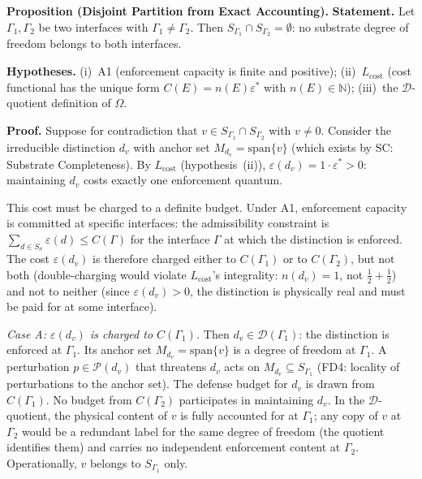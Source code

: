 \documentclass[11pt]{article}
\theoremstyle{remark}
\begin{document}
\medskip\noindent\textbf{Proposition (Disjoint Partition from Exact Accounting).}
\label{prop:disjoint_partition}
\textbf{Statement.}  Let $\Gamma_1, \Gamma_2$ be two interfaces with $\Gamma_1 \ne \Gamma_2$.  Then $S_{\Gamma_1} \cap S_{\Gamma_2} = \emptyset$: no substrate degree of freedom belongs to both interfaces.

\smallskip\noindent\textbf{Hypotheses.}  (i)~A1 (enforcement capacity is finite and positive); (ii)~$L_{\mathrm{cost}}$ (cost functional has the unique form $C(E) = n(E)\varepsilon^*$ with $n(E) \in \mathbb{N}$); (iii)~the $\mathcal{D}$-quotient definition of $\Omega$.

\smallskip\noindent\textbf{Proof.}  Suppose for contradiction that $v \in S_{\Gamma_1} \cap S_{\Gamma_2}$ with $v \ne 0$.  Consider the irreducible distinction $d_v$ with anchor set $M_{d_v} = \mathrm{span}\{v\}$ (which exists by SC: Substrate Completeness).  By $L_{\mathrm{cost}}$ (hypothesis~(ii)), $\varepsilon(d_v) = 1 \cdot \varepsilon^* > 0$: maintaining $d_v$ costs exactly one enforcement quantum.

This cost must be charged to a definite budget.  Under A1, enforcement capacity is committed at specific interfaces: the admissibility constraint is $\sum_{d \in S_\sigma} \varepsilon(d) \le C(\Gamma)$ for the interface $\Gamma$ at which the distinction is enforced.  The cost $\varepsilon(d_v)$ is therefore charged either to $C(\Gamma_1)$ or to $C(\Gamma_2)$, but not both (double-charging would violate $L_{\mathrm{cost}}$'s integrality: $n(d_v) = 1$, not $\tfrac{1}{2} + \tfrac{1}{2}$) and not to neither (since $\varepsilon(d_v) > 0$, the distinction is physically real and must be paid for at some interface).

\textit{Case A: $\varepsilon(d_v)$ is charged to $C(\Gamma_1)$.}  Then $d_v \in \mathcal{D}(\Gamma_1)$: the distinction is enforced at $\Gamma_1$.  Its anchor set $M_{d_v} = \mathrm{span}\{v\}$ is a degree of freedom at $\Gamma_1$.  A perturbation $p \in \mathcal{P}(d_v)$ that threatens $d_v$ acts on $M_{d_v} \subseteq S_{\Gamma_1}$ (FD4: locality of perturbations to the anchor set).  The defense budget for $d_v$ is drawn from $C(\Gamma_1)$.  No budget from $C(\Gamma_2)$ participates in maintaining $d_v$.  In the $\mathcal{D}$-quotient, the physical content of $v$ is fully accounted for at $\Gamma_1$; any copy of $v$ at $\Gamma_2$ would be a redundant label for the same degree of freedom (the quotient identifies them) and carries no independent enforcement content at $\Gamma_2$.  Operationally, $v$ belongs to $S_{\Gamma_1}$ only.
\end{document}
